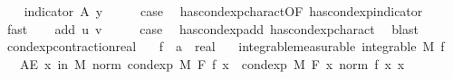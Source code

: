 \begin{isabellebody}
\isanewline
\ \ \isamarkupfalse%
\ {\isacharparenleft}{\kern0pt}indicator\ A\ y{\isacharparenright}{\kern0pt}\isanewline
\ \ \isamarkupfalse%
\ \isamarkupfalse%
\ {\isacharquery}{\kern0pt}case\ \isamarkupfalse%
\ has{\isacharunderscore}{\kern0pt}cond{\isacharunderscore}{\kern0pt}exp{\isacharunderscore}{\kern0pt}charact{\isacharbrackleft}{\kern0pt}OF\ has{\isacharunderscore}{\kern0pt}cond{\isacharunderscore}{\kern0pt}exp{\isacharunderscore}{\kern0pt}indicator{\isacharbrackright}{\kern0pt}\ \isamarkupfalse%
\ fast\isanewline
{}\isamarkupfalse%
\isanewline
\ \ \isamarkupfalse%
\ {\isacharparenleft}{\kern0pt}add\ u\ v{\isacharparenright}{\kern0pt}\isanewline
\ \ \isamarkupfalse%
\ \isamarkupfalse%
\ {\isacharquery}{\kern0pt}case\ \isamarkupfalse%
\ has{\isacharunderscore}{\kern0pt}cond{\isacharunderscore}{\kern0pt}exp{\isacharunderscore}{\kern0pt}add\ has{\isacharunderscore}{\kern0pt}cond{\isacharunderscore}{\kern0pt}exp{\isacharunderscore}{\kern0pt}charact{\isacharparenleft}{\kern0pt}{}{\isacharparenright}{\kern0pt}\ \isamarkupfalse%
\ blast\isanewline
{}\isamarkupfalse%
%
\endisatagproof
{\isafoldproof}%
%
\isadelimproof
\isanewline
%
\endisadelimproof
\isanewline
{}\isamarkupfalse%
\ cond{\isacharunderscore}{\kern0pt}exp{\isacharunderscore}{\kern0pt}contraction{\isacharunderscore}{\kern0pt}real{\isacharcolon}{\kern0pt}\isanewline
\ \ \ f\ {\isacharcolon}{\kern0pt}{\isacharcolon}{\kern0pt}\ {\isachardoublequoteopen}{\isacharprime}{\kern0pt}a\ {\isasymRightarrow}\ real{\isachardoublequoteclose}\isanewline
\ \ \ integrable{\isacharbrackleft}{\kern0pt}measurable{\isacharbrackright}{\kern0pt}{\isacharcolon}{\kern0pt}\ {\isachardoublequoteopen}integrable\ M\ f{\isachardoublequoteclose}\isanewline
\ \ \ {\isachardoublequoteopen}AE\ x\ in\ M{\isachardot}{\kern0pt}\ norm\ {\isacharparenleft}{\kern0pt}cond{\isacharunderscore}{\kern0pt}exp\ M\ F\ f\ x{\isacharparenright}{\kern0pt}\ {\isasymle}\ cond{\isacharunderscore}{\kern0pt}exp\ M\ F\ {\isacharparenleft}{\kern0pt}{\isasymlambda}x{\isachardot}{\kern0pt}\ norm\ {\isacharparenleft}{\kern0pt}f\ x{\isacharparenright}{\kern0pt}{\isacharparenright}{\kern0pt}\ x{\isachardoublequoteclose}\isanewline
%
\isadelimproof
%
\endisadelimproof
%
\isatagproof
{}\isamarkupfalse%
{\isacharminus}{\kern0pt}\isanewline
\ \ \isamarkupfalse%

\end{isabellebody}
